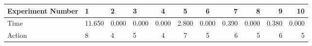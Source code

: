 \documentclass[8pt]{article}
\begin{document}
\begin{landscape}
\begin{tabular}{ | l | l | l | l | c | c | c | r | r | r | r | }
 \hline 
Experiment Number & 1 & 2 & 3 & 4 & 5 & 6 & 7 & 8 & 9 & 10\\ \hline
Time & 11.650 & 0.000 & 0.000 & 0.000 & 2.800 & 0.000 & 0.390 & 0.000 & 0.380 & 0.000\\ \hline
Action & 8 & 4 & 5 & 4 & 7 & 5 & 6 & 5 & 6 & 5\\ \hline\end{tabular}
\end{landscape}
\end{document}
